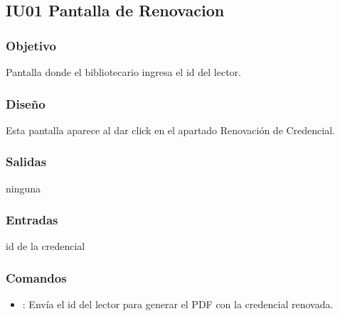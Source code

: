 \newpage
\subsection{IU01 Pantalla de Renovacion}

\subsubsection{Objetivo}
	Pantalla donde el bibliotecario ingresa el id del lector.

\subsubsection{Diseño}
	Esta pantalla aparece al dar click en el apartado Renovación de Credencial. 


\subsubsection{Salidas}
ninguna	
	
\subsubsection{Entradas}
	\begin{Citemize}
		\item id de la credencial		
	\end{Citemize}

\subsubsection{Comandos}
\begin{itemize}
	\item {}: Envía el id del lector para generar el PDF con la credencial renovada.
\end{itemize}

